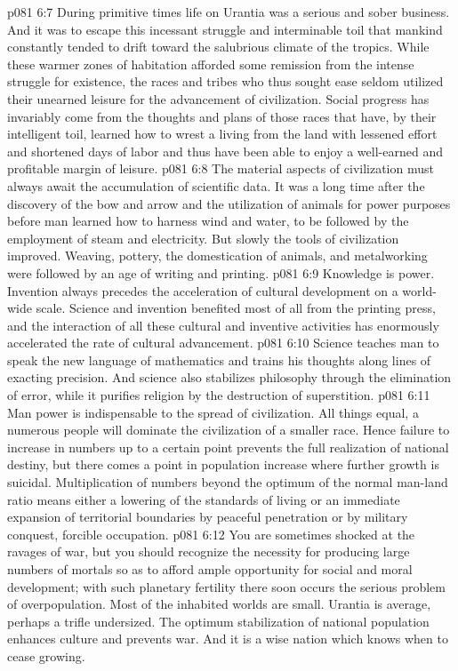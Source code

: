 \vs p081 6:7 During primitive times life on Urantia was a serious and sober business. And it was to escape this incessant struggle and interminable toil that mankind constantly tended to drift toward the salubrious climate of the tropics. While these warmer zones of habitation afforded some remission from the intense struggle for existence, the races and tribes who thus sought ease seldom utilized their unearned leisure for the advancement of civilization. Social progress has invariably come from the thoughts and plans of those races that have, by their intelligent toil, learned how to wrest a living from the land with lessened effort and shortened days of labor and thus have been able to enjoy a well\hyp{}earned and profitable margin of leisure.
\vs p081 6:8 \pc {}\bibnobreakspace {} The material aspects of civilization must always await the accumulation of scientific data. It was a long time after the discovery of the bow and arrow and the utilization of animals for power purposes before man learned how to harness wind and water, to be followed by the employment of steam and electricity. But slowly the tools of civilization improved. Weaving, pottery, the domestication of animals, and metalworking were followed by an age of writing and printing.
\vs p081 6:9 Knowledge is power. Invention always precedes the acceleration of cultural development on a world\hyp{}wide scale. Science and invention benefited most of all from the printing press, and the interaction of all these cultural and inventive activities has enormously accelerated the rate of cultural advancement.
\vs p081 6:10 Science teaches man to speak the new language of mathematics and trains his thoughts along lines of exacting precision. And science also stabilizes philosophy through the elimination of error, while it purifies religion by the destruction of superstition.
\vs p081 6:11 \pc {}\bibnobreakspace {} Man power is indispensable to the spread of civilization. All things equal, a numerous people will dominate the civilization of a smaller race. Hence failure to increase in numbers up to a certain point prevents the full realization of national destiny, but there comes a point in population increase where further growth is suicidal. Multiplication of numbers beyond the optimum of the normal man\hyp{}land ratio means either a lowering of the standards of living or an immediate expansion of territorial boundaries by peaceful penetration or by military conquest, forcible occupation.
\vs p081 6:12 You are sometimes shocked at the ravages of war, but you should recognize the necessity for producing large numbers of mortals so as to afford ample opportunity for social and moral development; with such planetary fertility there soon occurs the serious problem of overpopulation. Most of the inhabited worlds are small. Urantia is average, perhaps a trifle undersized. The optimum stabilization of national population enhances culture and prevents war. And it is a wise nation which knows when to cease growing.
